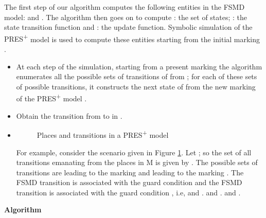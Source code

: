 \documentclass[9pt,executive]{article}
\def\presp{PRES\textsuperscript{+}}
\def\fsmd{FSMD}
\def\presp{PRES\textsuperscript{+}}
\def\fsmd{FSMD}
\begin{document}
The first step of our algorithm computes the following entities in the {\fsmd} model:   and .
 The algorithm then goes on to compute : the set of states; : the state transition function and : the update function. Symbolic simulation of the {\presp} model is used to compute these entities starting from the initial marking .
\begin{itemize}
 
 \item 
At each step of the simulation, starting from a present marking  the algorithm enumerates all the possible sets of transitions of  from ; for
each of these sets of possible transitions, it constructs the next state  of 
from the new marking  of the {\presp} model .
 \item 
 Obtain the transition from  to  in  .     
 \item
 \begin{figure}[htbp]
\centerline{}
\caption{Places and transitions in a {\presp} model}
\label{fig:guards}
\end{figure}
For example, consider the scenario given in Figure \ref{fig:guards}. Let ; so the set  of all transitions emanating from the places in M is given by . The possible sets of transitions are  leading to the marking  and  leading to the marking . The {\fsmd} transition  is associated with the guard condition  and the {\fsmd} transition  is associated with the guard condition , i.e,  and .  and .  and . 
 








 \end{itemize}


{\bf Algorithm}
\end{document}

